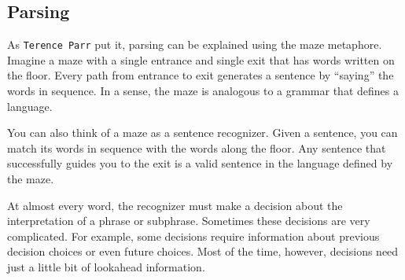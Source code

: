 

\subsection{Parsing}

As \texttt{Terence Parr} \cite{antlr} put it, parsing can be explained using the maze metaphore. Imagine a maze with a single entrance and single exit that has words written on the floor. Every path from entrance to exit generates a sentence by “saying” the words in sequence. In a sense, the maze is analogous to a grammar that defines a language.

You can also think of a maze as a sentence recognizer. Given a sentence, you can match its words in sequence with the words along the floor. Any sentence that successfully guides you to the exit is a valid sentence in the language defined by the maze. 

At almost every word, the recognizer must make a decision about the interpretation of a phrase or subphrase. Sometimes these decisions are very complicated. For example, some decisions require information about previous decision choices or even future choices. Most of the time, however, decisions need just a little bit of lookahead information.

% 



